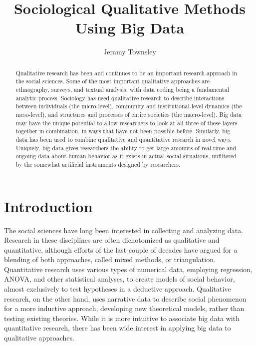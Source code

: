 \documentclass[sigconf]{acmart}
\begin{document}
\title{Sociological Qualitative Methods Using Big Data}


\author{Jeramy Townsley}


\begin{abstract}
Qualitative research has been and continues to be an important research approach in the social sciences.  Some of the most important qualitative approaches are ethnography, surveys, and textual analysis, with data coding being a fundamental analytic process.  Sociology has used qualitative research to describe interactions between individuals (the micro-level), community and institutional-level dynamics (the meso-level), and structures and processes of entire societies (the macro-level).  Big data may have the unique potential to allow researchers to look at all three of these layers together in combination, in ways that have not been possible before. Similarly, big data has been used to combine qualitative and quantitative research in novel ways.  Uniquely, big data gives researchers the ability to get large amounts of real-time and ongoing data about human behavior as it exists in actual social situations, unfiltered by the somewhat artificial instruments designed by researchers.
\end{abstract}



\maketitle

\section{Introduction}
The social sciences have long been interested in collecting and analyzing data.  Research in these disciplines are often dichotomized as qualitative and quantitative, although efforts of the last couple of decades have argued for a blending of both approaches, called mixed methods, or triangulation.  Quantitative research uses various types of numerical data, employing regression, ANOVA, and other statistical analyses, to create models of social behavior, almost exclusively to test hypotheses in a deductive approach.  Qualitative research, on the other hand, uses narrative data to describe social phenomenon for a more inductive approach, developing new theoretical models, rather than testing existing theories. \cite{bryman16} While it is more intuitive to associate big data with quantitative research, there has been wide interest in applying big data to qualitative approaches.
\end{document}

